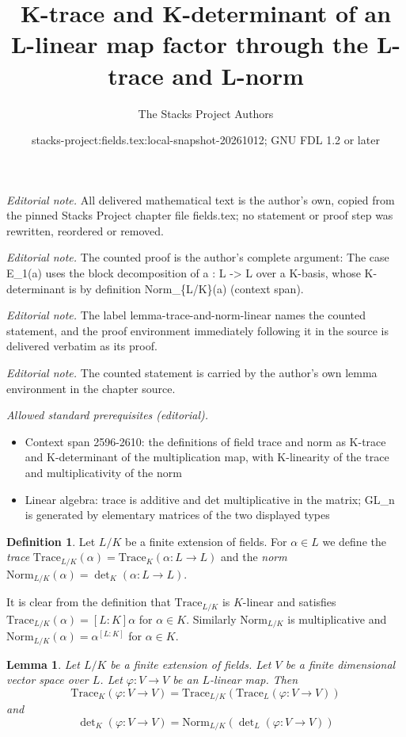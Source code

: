 \documentclass[10pt,a4paper]{amsart}
\title{K-trace and K-determinant of an L-linear map factor through the L-trace and L-norm}
\author{The Stacks Project Authors}
\date{stacks-project:fields.tex:local-snapshot-20261012; GNU FDL 1.2 or later}
\theoremstyle{plain}
\newtheorem{lemma}[subsection]{Lemma}
\theoremstyle{definition}
\newtheorem{definition}[subsection]{Definition}
\theoremstyle{remark}
\numberwithin{equation}{subsection}
\begin{document}
\maketitle
\noindent\textit{Editorial note.} All delivered mathematical text is the author's own, copied from the pinned Stacks Project chapter file fields.tex; no statement or proof step was rewritten, reordered or removed.\par\medskip
\noindent\textit{Editorial note.} The counted proof is the author's complete argument: The case E\_1(a) uses the block decomposition of a : L -> L over a K-basis, whose K-determinant is by definition Norm\_\{L/K\}(a) (context span).\par\medskip
\noindent\textit{Editorial note.} The label lemma-trace-and-norm-linear names the counted statement, and the proof environment immediately following it in the source is delivered verbatim as its proof.\par\medskip
\noindent\textit{Editorial note.} The counted statement is carried by the author's own lemma environment in the chapter source.\par\medskip
\noindent\textit{Allowed standard prerequisites (editorial).}\begin{itemize}
\item Context span 2596-2610: the definitions of field trace and norm as K-trace and K-determinant of the multiplication map, with K-linearity of the trace and multiplicativity of the norm
\item Linear algebra: trace is additive and det multiplicative in the matrix; GL\_n is generated by elementary matrices of the two displayed types
\end{itemize}\medskip
\begin{definition}
\label{definition-trace-norm}
Let $L/K$ be a finite extension of fields. For $\alpha \in L$ we define
the {\it trace}
$\text{Trace}_{L/K}(\alpha) = \text{Trace}_K(\alpha : L \to L)$
and the {\it norm}
$\text{Norm}_{L/K}(\alpha) = \det_K(\alpha : L \to L)$.
\end{definition}

\noindent
It is clear from the definition that
$\text{Trace}_{L/K}$ is $K$-linear and satisfies
$\text{Trace}_{L/K}(\alpha) = [L : K]\alpha$ for $\alpha \in K$.
Similarly $\text{Norm}_{L/K}$ is multiplicative and
$\text{Norm}_{L/K}(\alpha) = \alpha^{[L : K]}$ for $\alpha \in K$.

\begin{lemma}
\label{lemma-trace-and-norm-linear}
Let $L/K$ be a finite extension of fields. Let $V$ be a finite dimensional
vector space over $L$. Let $\varphi : V \to V$ be an $L$-linear map.
Then
$$
\text{Trace}_K(\varphi : V \to V) =
\text{Trace}_{L/K}(\text{Trace}_L(\varphi : V \to V))
$$
and
$$
\det\nolimits_K(\varphi : V \to V) =
\text{Norm}_{L/K}(\det\nolimits_L(\varphi : V \to V))
$$
\end{lemma}
\end{document}
